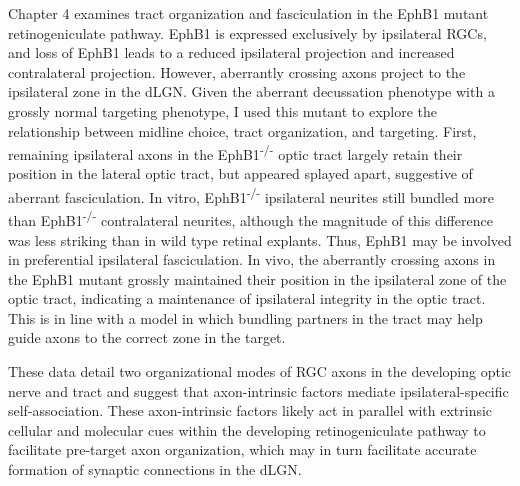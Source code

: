Chapter 4 examines tract organization and fasciculation in the EphB1 mutant retinogeniculate pathway.
EphB1 is expressed exclusively by ipsilateral RGCs, and loss of EphB1 leads to a reduced ipsilateral projection and increased contralateral projection.
However, aberrantly crossing axons project to the ipsilateral zone in the dLGN.
Given the aberrant decussation phenotype with a grossly normal targeting phenotype, I used this mutant to explore the relationship between midline choice, tract organization, and targeting.
First, remaining ipsilateral axons in the EphB1\textsuperscript{-/-} optic tract largely retain their position in the lateral optic tract, but appeared splayed apart, suggestive of aberrant fasciculation.
In vitro, EphB1\textsuperscript{-/-} ipsilateral neurites still bundled more than EphB1\textsuperscript{-/-} contralateral neurites, although the magnitude of this difference was less striking than in wild type retinal explants.
Thus, EphB1 may be involved in preferential ipsilateral fasciculation.
In vivo, the aberrantly crossing axons in the EphB1 mutant grossly maintained their position in the ipsilateral zone of the optic tract, indicating a maintenance of ipsilateral integrity in the optic tract.
This is in line with a model in which bundling partners in the tract may help guide axons to the correct zone in the target.

These data detail two organizational modes of RGC axons in the developing optic nerve and tract and suggest that axon-intrinsic factors mediate ipsilateral-specific self-association.
These axon-intrinsic factors likely act in parallel with extrinsic cellular and molecular cues within the developing retinogeniculate pathway to facilitate pre-target axon organization, which may in turn facilitate accurate formation of synaptic connections in the dLGN.